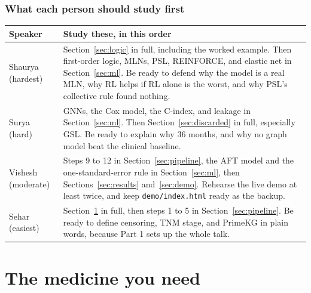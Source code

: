 \documentclass[11pt,a4paper]{article}
\begin{document}
\subsubsection{What each person should study first}
\begin{center}
\begin{tabular}{p{3.7cm}p{10.9cm}}
\toprule
Speaker & Study these, in this order \\
\midrule
Shaurya (hardest) & Section~\ref{sec:logic} in full, including the worked example. Then first-order logic, MLNs, PSL, REINFORCE, and elastic net in Section~\ref{sec:ml}. Be ready to defend why the model is a real MLN, why RL helps if RL alone is the worst, and why PSL's collective rule found nothing. \\
Surya (hard) & GNNs, the Cox model, the C-index, and leakage in Section~\ref{sec:ml}. Then Section~\ref{sec:discarded} in full, especially GSL. Be ready to explain why 36 months, and why no graph model beat the clinical baseline. \\
Vishesh (moderate) & Steps 9 to 12 in Section~\ref{sec:pipeline}, the AFT model and the one-standard-error rule in Section~\ref{sec:ml}, then Sections~\ref{sec:results} and~\ref{sec:demo}. Rehearse the live demo at least twice, and keep \texttt{demo/index.html} ready as the backup. \\
Sehar (easiest) & Section~\ref{sec:medicine} in full, then steps 1 to 5 in Section~\ref{sec:pipeline}. Be ready to define censoring, TNM stage, and PrimeKG in plain words, because Part 1 sets up the whole talk. \\
\bottomrule
\end{tabular}
\end{center}

\section{The medicine you need}\label{sec:medicine}
\end{document}
